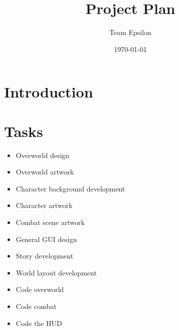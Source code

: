 \documentclass[12pt,titlepage]{article}
\title{Project Plan}
\author{Team Epsilon}
\date{\today}
\begin{document}
\maketitle

\section{Introduction}

\section{Tasks}

\begin{itemize}
    \item Overworld design
    \item Overworld artwork
    \item Character background development
    \item Character artwork
    \item Combat scene artwork
    \item General GUI design
    \item Story development
    \item World layout development
    \item Code overworld
    \item Code combat
    \item Code the HUD
\end{itemize}
\end{document}
